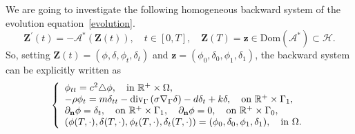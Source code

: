 \documentclass[10pt]{elsarticle}
\begin{document}
We are going to investigate the following homogeneous backward system of the evolution equation~\eqref{evolution}.
\begin{equation} \label{adjoint:abstract}
            \mathbf{Z}^{\prime}(t)= -\mathcal{A}^{\ast}(\mathbf{ Z}(t)),\quad t\in[0, T],\quad \mathbf{ Z}(T) = \mathbf{ z}\in\mathrm{Dom}(\mathcal{A}^{\ast})\subset\mathcal{H}.
\end{equation} 
So, setting $\mathbf{ Z}(t) = (\phi, \delta, \phi_t, \delta_t)$ and $\mathbf{ z}=(\phi_0, \delta_0, \phi_1, \delta_1)$, the backward system can be explicitly written as
\begin{equation} \label{adjoint}
\left
    \{
        \begin{array}{ll}
        		\phi_{tt} = c^2\triangle\phi, \quad \textrm{in $\mathbb{R}^{+} \times \Omega$},\\
            -\rho \phi_t= m \delta_{tt} - \mathrm{div}_{\Gamma}\left(\sigma\nabla_{\Gamma} \delta\right) - d \delta_t + k \delta, \quad \textrm{on $\mathbb{R}^{+} \times \Gamma_1$},\\ 
            \partial_{\mathbf{n}}\phi =\delta_t, \quad \textrm{on $\mathbb{R}^{+} \times \Gamma_1$}, \quad \partial_{\mathbf{n}}\phi = 0, \quad \textrm{on $\mathbb{R}^{+} \times \Gamma_0$},\\
            \left(\phi(T, \cdot), \delta(T, \cdot), \phi_t(T, \cdot), \delta_t(T, \cdot)\right) = (\phi_0, \delta_0, \phi_1, \delta_1), \quad \textrm{in $ \Omega$}.
        \end{array} 
\right.
\end{equation}
\end{document}
